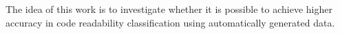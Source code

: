 \documentclass[%
class=scrreprt,
chapterprefix=false,%
open=right,%
twoside=false,%
paper=a4,%
logofile={Logo\_zentral\_farbig\_EN.png},%
thesistype=master,%
UKenglish,%
]{se2thesis}
\theoremstyle{definition}
\begin{document}
	The idea of this work is to investigate whether it is possible to achieve higher accuracy in code readability classification using automatically generated data. 
	
		
\end{document}
